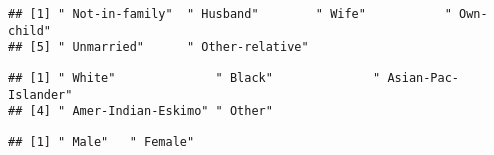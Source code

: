 \documentclass[]{article}
\newenvironment{Shaded}{\begin{snugshade}}{\end{snugshade}}
\newcommand{\DataTypeTok}[1]{\textcolor[rgb]{0.13,0.29,0.53}{#1}}
\newcommand{\KeywordTok}[1]{\textcolor[rgb]{0.13,0.29,0.53}{\textbf{#1}}}
\newcommand{\NormalTok}[1]{#1}
\newcommand{\OperatorTok}[1]{\textcolor[rgb]{0.81,0.36,0.00}{\textbf{#1}}}
\newcommand{\StringTok}[1]{\textcolor[rgb]{0.31,0.60,0.02}{#1}}
\begin{document}
\begin{verbatim}
## [1] " Not-in-family"  " Husband"        " Wife"           " Own-child"     
## [5] " Unmarried"      " Other-relative"
\end{verbatim}

\begin{Shaded}
\end{Shaded}

\begin{verbatim}
## [1] " White"              " Black"              " Asian-Pac-Islander"
## [4] " Amer-Indian-Eskimo" " Other"
\end{verbatim}

\begin{Shaded}
\end{Shaded}

\begin{verbatim}
## [1] " Male"   " Female"
\end{verbatim}

\begin{Shaded}
\end{Shaded}
\end{document}
